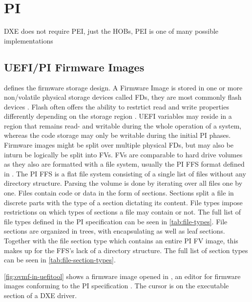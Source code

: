 
\section{\acf{PI}}

\ac{DXE} does not require \ac{PEI}, just the \acp{HOB}, \ac{PEI} is one of many possible implementations

\subsection{\acs{UEFI}/\acs{PI} Firmware Images}

\cite[Vol. 3, 2]{pi-spec} defines the firmware storage design.
A Firmware Image is stored in one or more non\-/volatile physical storage devices called \acp{FD}, they are most commonly flash devices \cite[Vol. 3, 2.1]{pi-spec}.
Flash often offers the ability to restrtict read and write properties differently depending on the storage region \cite[Vol. 3, 2.1.1]{pi-spec}.
\ac{UEFI} variables may reside in a region that remains read- and writable during the whole operation of a system, whereas the code storage may only be writable during the initial \ac{PI} phases.
Firmware images might be split over multiple physical \acp{FD}, but may also be inturn be logically be split into \acp{FV}.
\acp{FV} are comparable to hard drive volumes as they also are formatted with a file system, usually the \ac{PI} \ac{FFS} format defined in \cite[Vol. 3, 2.2]{pi-spec}.
The \ac{PI} \ac{FFS} is a flat file system consisting of a single list of files without any directory structure.
Parsing the volume is done by iterating over all files one by one.
Files contain code or data in the form of sections.
Sections split a file in discrete parts with the type of a section dictating its content.
File types impose restrictions on which types of sections a file may contain or not.
The full list of file types defined in the \ac{PI} specification can be seen in \autoref{tab:file-types}.
File sections are organized in trees, with encapsulating as well as leaf sections.
Together with the file section type  which contains an entire \ac{PI} \ac{FV} image, this makes up for the \ac{FFS}'s lack of a directory structure.
The full list of section types can be seen in \autoref{tab:file-section-types}.

\autoref{fig:ovmf-in-uefitool} shows a firmware image opened in , an editor for firmware images conforming to the \ac{PI} specification \cite{uefitool}.
The cursor is on the executable section of a \acs{DXE} driver.


